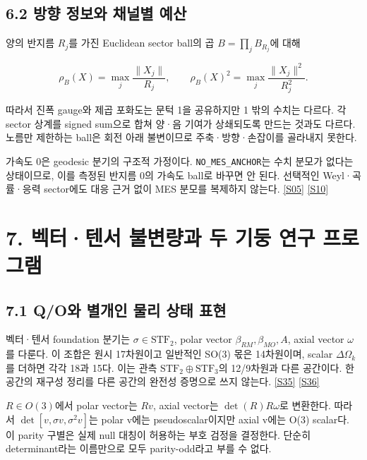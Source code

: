 \documentclass[11pt,a4paper]{article}
\begin{document}
\subsection*{6.2 방향 정보와 채널별 예산}

양의 반지름 \(R_j\)를 가진 Euclidean sector ball의 곱 \(B=\prod_jB_{R_j}\)에 대해


\[
\rho_B(X)=\max_j\frac{\|X_j\|}{R_j},\qquad
\rho_B(X)^2=\max_j\frac{\|X_j\|^2}{R_j^2}.
\]

따라서 진폭 gauge와 제곱 포화도는 문턱 1을 공유하지만 1 밖의 수치는 다르다. 각 sector 상계를 signed sum으로 합쳐 양·음 기여가 상쇄되도록 만드는 것과도 다르다. 노름만 제한하는 ball은 회전 아래 불변이므로 주축·방향·손잡이를 골라내지 못한다.


가속도 0은 geodesic 분기의 구조적 가정이다. \texttt{NO\_MES\_ANCHOR}는 수치 분모가 없다는 상태이므로, 이를 측정된 반지름 0의 가속도 ball로 바꾸면 안 된다. 선택적인 Weyl·곡률·응력 sector에도 대응 근거 없이 MES 분모를 복제하지 않는다. \hyperlink{src:S05}{[S05]} \hyperlink{src:S10}{[S10]}


\hypertarget{s7}{}

\section*{7. 벡터·텐서 불변량과 두 기둥 연구 프로그램}


\subsection*{7.1 Q/O와 별개인 물리 상태 표현}

벡터·텐서 foundation 분기는 \(\sigma\in\mathrm{STF}_2\), polar vector \(\beta_{RM},\beta_{MO},A\), axial vector \(\omega\)를 다룬다. 이 조합은 원시 17차원이고 일반적인 SO(3) 몫은 14차원이며, scalar \(\Delta\Omega_k\)를 더하면 각각 18과 15다. 이는 관측 \(\mathrm{STF}_2\oplus\mathrm{STF}_3\)의 12/9차원과 다른 공간이다. 한 공간의 재구성 정리를 다른 공간의 완전성 증명으로 쓰지 않는다. \hyperlink{src:S35}{[S35]} \hyperlink{src:S36}{[S36]}


\(R\in O(3)\)에서 polar vector는 \(Rv\), axial vector는 \(\det(R)R\omega\)로 변환한다. 따라서 \(\det[v,\sigma v,\sigma^2v]\)는 polar v에는 pseudoscalar이지만 axial v에는 O(3) scalar다. 이 parity 구별은 실제 null 대칭이 허용하는 부호 검정을 결정한다. 단순히 determinant라는 이름만으로 모두 parity-odd라고 부를 수 없다.
\end{document}
